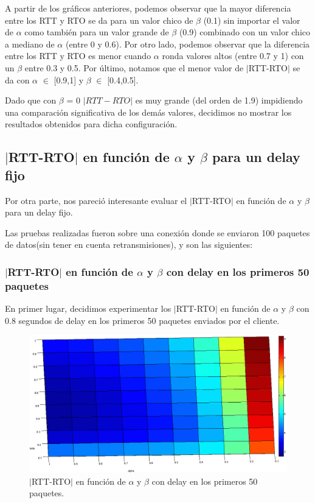 \documentclass[10pt, a4paper]{article}
\begin{document}
A partir de los gráficos anteriores, podemos observar que la mayor diferencia entre los RTT y RTO se da para un valor chico de $\beta$ (0.1) sin importar el valor de $\alpha$ como también para un valor grande de $\beta$ (0.9) combinado con un valor chico a mediano de $\alpha$ (entre 0 y 0.6).
Por otro lado, podemos observar que la diferencia entre los RTT y RTO es menor cuando $\alpha$ ronda valores altos (entre 0.7 y 1) con un $\beta$ entre 0.3 y 0.5.
Por último, notamos que el menor valor de $|$RTT-RTO$|$ se da con $\alpha$ $\in$ [0.9,1] y $\beta$ $\in$ [0.4,0.5].

Dado que con $\beta$ = 0 $|RTT-RTO|$ es muy grande (del orden de 1.9) impidiendo una comparación significativa de los demás valores, decidimos no mostrar los resultados obtenidos para dicha configuración.

\newpage
\subsection{$|$RTT-RTO$|$ en función de $\alpha$ y $\beta$ para un delay fijo}

Por otra parte, nos pareció interesante evaluar el $|$RTT-RTO$|$ en función de $\alpha$ y $\beta$ para un delay fijo. 

Las pruebas realizadas fueron sobre una conexión donde se enviaron 100 paquetes de datos(sin tener en cuenta retransmisiones), y son  las siguientes:

\subsubsection{$|$RTT-RTO$|$ en función de $\alpha$ y $\beta$ con delay en los primeros 50 paquetes}
En primer lugar, decidimos experimentar los $|$RTT-RTO$|$ en función de $\alpha$ y $\beta$ con 0.8 segundos de delay en los primeros 50 paquetes enviados por el cliente.

\begin{figure}[H]
\begin{center}
\includegraphics[width=17cm]{delay-50F.png}
\caption{$|$RTT-RTO$|$ en función de $\alpha$ y $\beta$ con delay en los primeros 50 paquetes.}
\end{center}
\end{figure}
\end{document}
